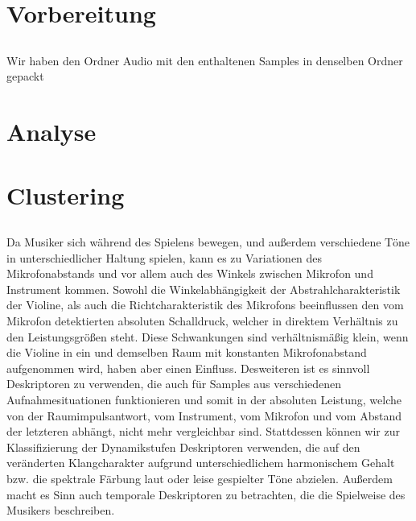 \section{Vorbereitung}
\label{sec:preperation}
\subsection{}
Wir haben den Ordner Audio mit den enthaltenen Samples in denselben Ordner gepackt


\section{Analyse}
\label{sec:analyse}




\section{Clustering}
\label{sec:cluster}

\subsection{}

Da Musiker sich während des Spielens bewegen, und außerdem verschiedene Töne in unterschiedlicher Haltung spielen, kann es zu Variationen des Mikrofonabstands und vor allem auch des Winkels zwischen Mikrofon und Instrument kommen. 
Sowohl die Winkelabhängigkeit der Abstrahlcharakteristik der Violine, als auch die Richtcharakteristik des Mikrofons beeinflussen den vom Mikrofon detektierten absoluten Schalldruck, welcher in direktem Verhältnis zu den Leistungsgrößen steht. 
Diese Schwankungen sind verhältnismäßig klein, wenn die Violine in ein und demselben Raum mit konstanten Mikrofonabstand aufgenommen wird, haben aber einen Einfluss.
Desweiteren ist es sinnvoll Deskriptoren zu verwenden, die auch für Samples aus verschiedenen Aufnahmesituationen funktionieren und somit in der absoluten Leistung, welche von der Raumimpulsantwort, vom Instrument, vom Mikrofon und vom Abstand der letzteren abhängt, nicht mehr vergleichbar sind.
Stattdessen können wir zur Klassifizierung der Dynamikstufen Deskriptoren verwenden, die auf den veränderten Klangcharakter aufgrund unterschiedlichem harmonischem Gehalt bzw. die spektrale Färbung laut oder leise gespielter Töne abzielen.
Außerdem macht es Sinn auch temporale Deskriptoren zu betrachten, die die Spielweise des Musikers beschreiben.
